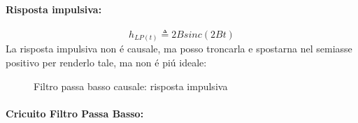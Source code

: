             \paragraph{Risposta impulsiva:}
            \[
                h_{LP(t)}\triangleq 2Bsinc(2Bt)  
            \]
            La risposta impulsiva non é causale, ma posso troncarla e spostarna nel semiasse positivo per renderlo tale, ma non é piú ideale:
            \begin{figure}[H]
                \centering


                \caption{Filtro passa basso causale: risposta impulsiva}
                \label{fig:filtro passa basso ideale causale}
            \end{figure} 

            \paragraph{Cricuito Filtro Passa Basso:}
            
